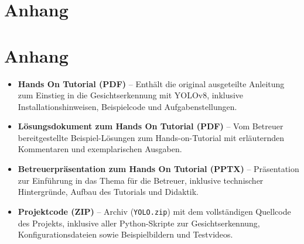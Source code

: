\section{Anhang}

\section*{Anhang}

\begin{itemize}
    \item \textbf{Hands On Tutorial (PDF)} – Enthält die original ausgeteilte Anleitung zum Einstieg in die Gesichtserkennung mit YOLOv8, inklusive Installationshinweisen, Beispielcode und Aufgabenstellungen.
    
    \item \textbf{Lösungsdokument zum Hands On Tutorial (PDF)} – Vom Betreuer bereitgestellte Beispiel-Lösungen zum Hands-on-Tutorial mit erläuternden Kommentaren und exemplarischen Ausgaben.
    
    \item \textbf{Betreuerpräsentation zum Hands On Tutorial (PPTX)} – Präsentation zur Einführung in das Thema für die Betreuer, inklusive technischer Hintergründe, Aufbau des Tutorials und Didaktik.
    
    \item \textbf{Projektcode (ZIP)} – Archiv (\texttt{YOLO.zip}) mit dem vollständigen Quellcode des Projekts, inklusive aller Python-Skripte zur Gesichtserkennung, Konfigurationsdateien sowie Beispielbildern und Testvideos.
\end{itemize}


